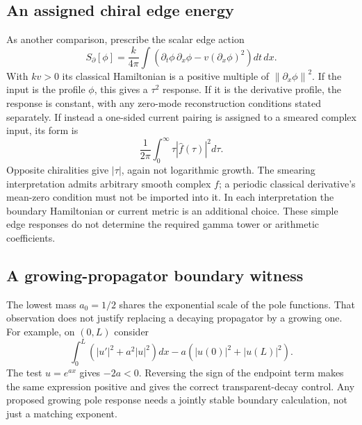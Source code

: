 \documentclass[11pt]{article}
\numberwithin{equation}{section}
\theoremstyle{definition}
\theoremstyle{remark}
\newcommand{\norm}[1]{\left\lVert#1\right\rVert}
\begin{document}
\subsection{An assigned chiral edge energy}
As another comparison, prescribe the scalar edge action
\begin{equation}
 S_\partial[\phi]=\frac{k}{4\pi}\int
 \left(\partial_t\phi\,\partial_x\phi-v(\partial_x\phi)^2\right)dt\,dx.
\end{equation}
With $kv>0$ its classical Hamiltonian is a positive multiple of $\norm{\partial_x\phi}^2$. If the input is the profile $\phi$, this gives a $\tau^2$ response. If it is the derivative profile, the response is constant, with any zero-mode reconstruction conditions stated separately. If instead a one-sided current pairing is assigned to a smeared complex input, its form is
\begin{equation}
 \frac1{2\pi}\int_0^\infty\tau|\widehat f(\tau)|^2d\tau.
\end{equation}
Opposite chiralities give $|\tau|$, again not logarithmic growth. The smearing interpretation admits arbitrary smooth complex $f$; a periodic classical derivative's mean-zero condition must not be imported into it. In each interpretation the boundary Hamiltonian or current metric is an additional choice. These simple edge responses do not determine the required gamma tower or arithmetic coefficients.

\subsection{A growing-propagator boundary witness}
The lowest mass $a_0=1/2$ shares the exponential scale of the pole functions. That observation does not justify replacing a decaying propagator by a growing one. For example, on $(0,L)$ consider
\begin{equation}
 \int_0^L(|u'|^2+a^2|u|^2)dx-a(|u(0)|^2+|u(L)|^2).
\end{equation}
The test $u=e^{ax}$ gives $-2a<0$. Reversing the sign of the endpoint term makes the same expression positive and gives the correct transparent-decay control. Any proposed growing pole response needs a jointly stable boundary calculation, not just a matching exponent.
\end{document}
